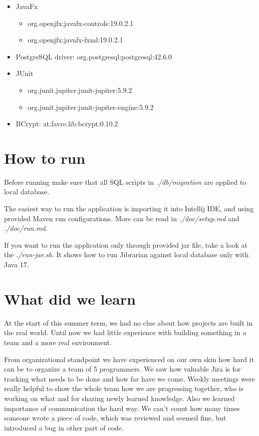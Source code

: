 \documentclass[11pt,twoside,a4paper]{article}
\begin{document}
\begin{itemize}
    \item JavaFx
          \begin{itemize}
              \item org.openjfx:javafx-controls:19.0.2.1
              \item org.openjfx:javafx-fxml:19.0.2.1
          \end{itemize}
    \item PostgreSQL driver: org.postgresql:postgresql:42.6.0
    \item JUnit
          \begin{itemize}
              \item org.junit.jupiter:junit-jupiter:5.9.2
              \item org.junit.jupiter:junit-jupiter-engine:5.9.2
          \end{itemize}
    \item BCrypt: at.favre.lib:bcrypt:0.10.2
\end{itemize}

\section{How to run}

Before running make sure that all SQL scripts in \emph{./db/migration} are applied
to local database.

The easiest way to run the application is importing it into Intellij IDE, and
using provided Maven run configurations. More can be read in \emph{./doc/setup.md}
and \emph{./doc/run.md}.

If you want to run the application only through provided jar file, take a look
at the \emph{./run-jar.sh}. It shows how to run Jibrarian against local database
only with Java 17.

\section{What did we learn}

At the start of this summer term, we had no clue about how projects are built
in the real world. Until now we had little experience with building something
in a team and a more real environment.

From organizational standpoint we have experienced on our own skin how hard it
can be to organize a team of 5 programmers. We saw how valuable Jira is for
tracking what needs to be done and how far have we come. Weekly meetings were
really helpful to show the whole team how we are progressing together, who is
working on what and for sharing newly learned knowledge. Also we learned
importance of communication the hard way. We can't count how many times someone
wrote a piece of code, which was reviewed and seemed fine, but introduced
a bug in other part of code.
\end{document}
